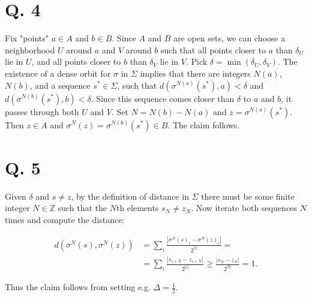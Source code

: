 \documentclass[12pt,A4]{article}
\begin{document}
\clearpage
\section*{Q. 4}
Fix "points" $a \in A$ and $b \in B$. Since $A$ and $B$ are open sets, we can choose a neighborhood $U$ around $a$ and $V$ around $b$ such that all points closer to $a$ than $\delta_U$ lie in $U$, and all points closer to $b$ than $\delta_V$ lie in $V$. Pick $\delta = \min(\delta_U, \delta_V)$. The existence of a dense orbit for $\sigma$ in $\Sigma$ implies that there are integers $N(a)$, $N(b)$, and a sequence $s^* \in \Sigma$, such that $d(\sigma^{N(a)}(s^*), a) < \delta$ and $d(\sigma^{N(b)}(s^*), b) < \delta$. Since this sequence comes closer than $\delta$ to $a$ and $b$, it passes through both $U$ and $V$. Set $N = N(b) - N(a)$ and $z = \sigma^{N(a)}(s^*)$. Then $z \in A$ and $\sigma^N(z) = \sigma^{N(b)}(s^*) \in B$. The claim follows.

\clearpage
\section*{Q. 5}

Given $\delta$ and $s \ne z$, by the definition of distance in $\Sigma$ there must be some finite integer $N \in \mathbb{Z}$ such that the $N$th elements $s_{N} \ne z_{N}$. Now iterate both sequences $N$ times and compute the distance: 

\begin{equation}
\begin{aligned}
    d(\sigma^N(s), \sigma^N(z)) &= \sum_i \frac{|\sigma^N(s)_i - \sigma^N(z)_i|}{2^{|i|}} =\\&= \sum_i \frac{|s_{i+N} - z_{i+N}|}{2^{|i|}} \geq \frac{|s_{N} - z_{N}|}{2^{|0|}} = 1.
\end{aligned}
\end{equation}

Thus the claim follows from setting e.g. $\Delta = \frac{1}{2}$.
\end{document}
